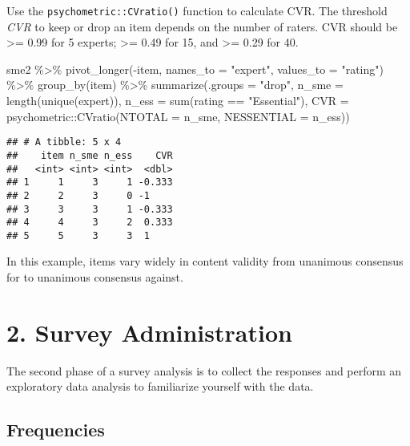 \documentclass[
]{book}
\newenvironment{Shaded}{\begin{snugshade}}{\end{snugshade}}
\newcommand{\AttributeTok}[1]{\textcolor[rgb]{0.77,0.63,0.00}{#1}}
\newcommand{\FunctionTok}[1]{\textcolor[rgb]{0.00,0.00,0.00}{#1}}
\newcommand{\NormalTok}[1]{#1}
\newcommand{\SpecialCharTok}[1]{\textcolor[rgb]{0.00,0.00,0.00}{#1}}
\newcommand{\StringTok}[1]{\textcolor[rgb]{0.31,0.60,0.02}{#1}}
\theoremstyle{definition}
\theoremstyle{definition}
\theoremstyle{definition}
\theoremstyle{definition}
\theoremstyle{remark}
\begin{document}
Use the \texttt{psychometric::CVratio()} function to calculate CVR. The threshold \emph{CVR} to keep or drop an item depends on the number of raters. CVR should be \textgreater= 0.99 for 5 experts; \textgreater= 0.49 for 15, and \textgreater= 0.29 for 40.

\begin{Shaded}
\begin{Highlighting}[]
\NormalTok{sme2 }\SpecialCharTok{\%\textgreater{}\%} 
  \FunctionTok{pivot\_longer}\NormalTok{(}\SpecialCharTok{{-}}\NormalTok{item, }\AttributeTok{names\_to =} \StringTok{"expert"}\NormalTok{, }\AttributeTok{values\_to =} \StringTok{"rating"}\NormalTok{) }\SpecialCharTok{\%\textgreater{}\%}
  \FunctionTok{group\_by}\NormalTok{(item) }\SpecialCharTok{\%\textgreater{}\%} 
  \FunctionTok{summarize}\NormalTok{(}\AttributeTok{.groups =} \StringTok{"drop"}\NormalTok{,}
            \AttributeTok{n\_sme =} \FunctionTok{length}\NormalTok{(}\FunctionTok{unique}\NormalTok{(expert)),}
            \AttributeTok{n\_ess =} \FunctionTok{sum}\NormalTok{(rating }\SpecialCharTok{==} \StringTok{"Essential"}\NormalTok{),}
            \AttributeTok{CVR =}\NormalTok{ psychometric}\SpecialCharTok{::}\FunctionTok{CVratio}\NormalTok{(}\AttributeTok{NTOTAL =}\NormalTok{ n\_sme, }\AttributeTok{NESSENTIAL =}\NormalTok{ n\_ess))}
\end{Highlighting}
\end{Shaded}

\begin{verbatim}
## # A tibble: 5 x 4
##    item n_sme n_ess    CVR
##   <int> <int> <int>  <dbl>
## 1     1     3     1 -0.333
## 2     2     3     0 -1    
## 3     3     3     1 -0.333
## 4     4     3     2  0.333
## 5     5     3     3  1
\end{verbatim}

In this example, items vary widely in content validity from unanimous consensus for to unanimous consensus against.

\hypertarget{survey-administration}{%
\section{2. Survey Administration}\label{survey-administration}}

The second phase of a survey analysis is to collect the responses and perform an exploratory data analysis to familiarize yourself with the data.

\hypertarget{frequencies}{%
\subsection{Frequencies}\label{frequencies}}
\end{document}

